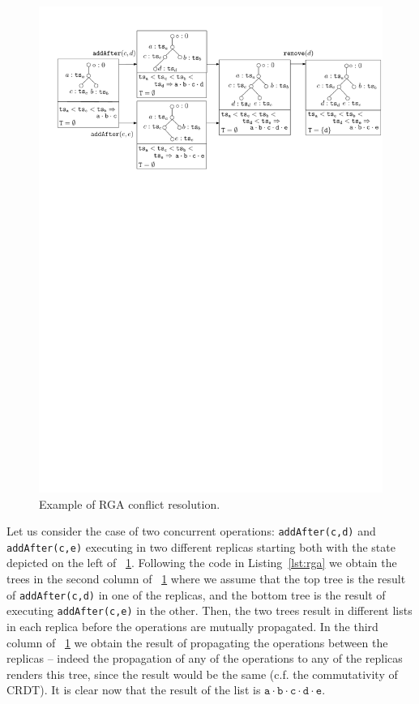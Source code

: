 \begin{figure}[t]
  \centering
  \includegraphics[width=.77\textwidth]{figures/RGA-Trace}
  \vspace{-2mm}
  \caption{Example of RGA conflict resolution.}
  \label{fig:rga-trace}
  \vspace{-5mm}
\end{figure}

Let us consider the case of two concurrent operations:
\lstinline|addAfter(c,d)| and \lstinline|addAfter(c,e)| executing in
two different replicas starting both with the state depicted on the
left of \figureautorefname~\ref{fig:rga-trace}.
%
Following the code in Listing~\ref{lst:rga} we obtain the trees in the
second column of \figureautorefname~\ref{fig:rga-trace} where we assume that the
top tree is the result of \lstinline|addAfter(c,d)| in one of the
replicas, and the bottom tree is the result of executing
\lstinline|addAfter(c,e)| in the other.
%
Then, the two trees result in different lists in each
replica before the operations are mutually propagated.
%
In the third column of \figureautorefname~\ref{fig:rga-trace} we obtain the
result of propagating the operations between the replicas -- indeed
the propagation of any of the operations to any of the replicas
renders this tree, since the result would be the same (c.f. the
commutativity of CRDT).
%
It is clear now that the result of the list is $\mathtt{a \cdot b
  \cdot c \cdot d \cdot e}$.


